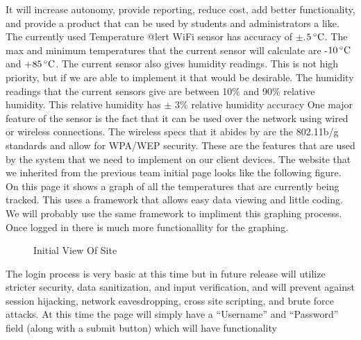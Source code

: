 \documentclass{report}
\begin{document}
It will increase autonomy, provide reporting, reduce cost, add better functionality, 
and provide a product that can be used by students and administrators a like.
\newline
\indent
	The currently used Temperature @lert WiFi sensor has accuracy of $\pm$.$5\,^{\circ}{\rm C}$. The max and minimum temperatures that the current sensor will calculate are -$10\,^{\circ}{\rm C}$ and +$85\,^{\circ}{\rm C}$. 
The current sensor also gives humidity readings. 
This is not high priority, but if we are able to implement it that would be desirable.
 The humidity readings that the current sensors give are between 10$\%$ and 90$\%$ relative humidity. 
This relative humidity has $\pm$ 3$\%$ relative humidity accuracy One major feature of the sensor is the fact that it can be used over the network using wired or wireless connections. 
The wireless specs that it abides by are the 802.11b/g standards and allow for WPA/WEP security. 
These are the features that are used by the system that we need to implement on our client devices.
\newline
\indent
The website that we inherited from the previous team initial page looks like the following figure. 
On this page it shows a graph of all the temperatures that are currently being tracked. 
This uses a framework that allows easy data viewing and little coding. 
We will probably use the same framework to impliment this graphing processs. 
Once logged in there is much more functionallity for the graphing. 
\begin{figure}[H]
\caption{Initial View Of Site}
\end{figure}
The login process is very basic at this time but in future release will utilize stricter security, data sanitization, and input verification,
and will prevent against session hijacking, network eavesdropping, cross site scripting, and brute force attacks. 
At this time the page will simply have a “Username” and “Password” field (along with a submit button) which will have functionality
\end{document}

